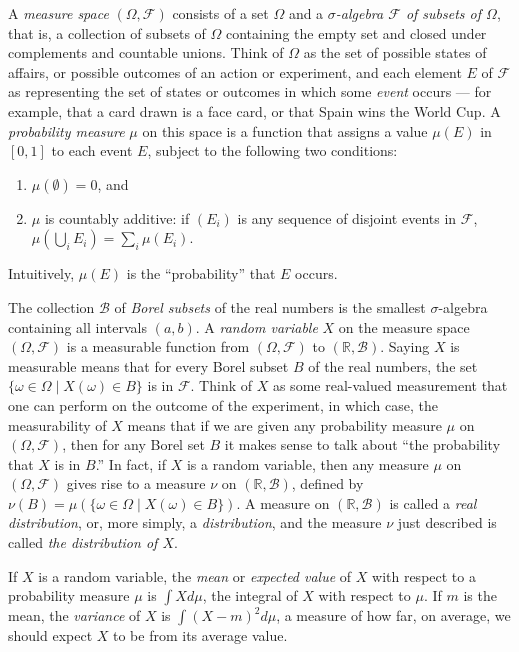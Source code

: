 \documentclass{svjour3}
\newcommand{\RR}{\mathbb{R}}
\newcommand{\mdl}[1]{{\mathcal #1}} %
\begin{document}
A \emph{measure space} $(\Omega, \mdl F)$ consists of a set $\Omega$ and a \emph{$\sigma$-algebra $\mdl F$ of subsets of $\Omega$}, that is, a collection of subsets of $\Omega$ containing the empty set and closed under complements and countable unions. Think of $\Omega$ as the set of possible states of affairs, or possible outcomes of an action or experiment, and each element $E$ of $\mdl F$ as representing the set of states or outcomes in which some \emph{event} occurs --- for example, that a card drawn is a face card, or that Spain wins the World Cup. A \emph{probability measure} $\mu$ on this space is a function that assigns a value $\mu(E)$ in $[0, 1]$ to each event $E$, subject to the following two conditions:
\begin{enumerate}
 \item $\mu(\emptyset) = 0$, and
 \item $\mu$ is countably additive: if $(E_i)$ is any sequence of disjoint events in $\mdl F$, $\mu(\bigcup_i E_i) = \sum_i \mu(E_i)$.
\end{enumerate}
Intuitively, $\mu(E)$ is the ``probability'' that $E$ occurs. 

The collection $\mdl B$ of \emph{Borel subsets} of the real numbers is the smallest $\sigma$-algebra containing all intervals $(a, b)$. A \emph{random variable} $X$ on the measure space $(\Omega, \mdl F)$ is a measurable function from $(\Omega, \mdl F)$ to $(\RR, \mdl B)$. Saying $X$ is measurable means that for every Borel subset $B$ of the real numbers, the set $\{ \omega \in \Omega \; | \; X(\omega) \in B \}$ is in $\mdl F$. Think of $X$ as some real-valued measurement that one can perform on the outcome of the experiment, in which case, the measurability of $X$ means that if we are given any probability measure $\mu$ on $(\Omega, \mdl F)$, then for any Borel set $B$ it makes sense to talk about ``the probability that $X$ is in $B$.'' In fact, if $X$ is a random variable, then any measure $\mu$ on $(\Omega, \mdl F)$ gives rise to a measure $\nu$ on $(\RR, \mdl B)$, defined by $\nu(B) = \mu ( \{ \omega \in \Omega \; | \; X (\omega) \in B \})$. A measure on $(\RR, \mdl B)$ is called a \emph{real distribution}, or, more simply, a \emph{distribution}, and the measure $\nu$ just described is called \emph{the distribution of $X$}.

If $X$ is a random variable, the \emph{mean} or \emph{expected value} of $X$ with respect to a probability measure $\mu$ is $\int X d\mu$, the integral of $X$ with respect to $\mu$. If $m$ is the mean, the \emph{variance} of $X$ is $\int (X - m)^2 d\mu$, a measure of how far, on average, we should expect $X$ to be from its average value.
\end{document}
